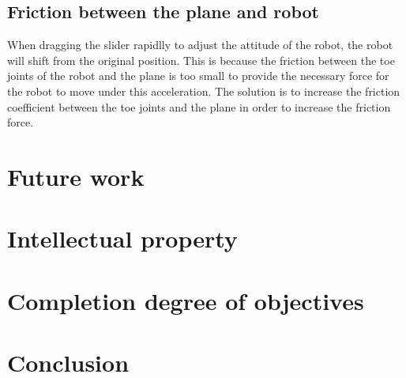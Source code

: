 \subsection{Friction between the plane and robot}
When dragging the slider rapidlly to adjust the attitude of the robot, the robot will shift from the original position. This is because the friction between the toe joints of the robot and the plane is too small to provide the necessary force for the robot to move under this acceleration. The solution is to increase the friction coefficient between the toe joints and the plane in order to increase the friction force.


\section{Future work}


\section{Intellectual property}

\section{Completion degree of objectives}

\section{Conclusion}
